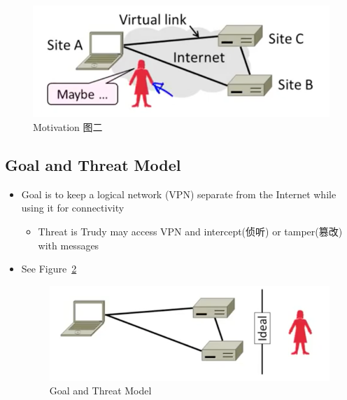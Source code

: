 \documentclass[12pt]{ctexart}   %
\begin{document}
\begin{itemize}
		\begin{figure}[h!] %
		\centering
		\includegraphics[scale=0.7]{images/10-8-2}
		\caption{Motivation 图二}
		\label{fig:10-8-2}
		\end{figure}
	\end{itemize}

	\subsection{Goal and Threat Model}
	\begin{itemize}
		\item Goal is to keep a logical network (VPN) separate from the Internet while using it for connectivity
		\begin{itemize}
			\item Threat is Trudy may access VPN and intercept(侦听) or tamper(篡改) with messages
		\end{itemize}
		\item See Figure~\ref{fig:10-8-3}
		  
		\begin{figure}[h!] %
		\centering
		\includegraphics[scale=0.7]{images/10-8-3}
		\caption{Goal and Threat Model}
		\label{fig:10-8-3}
		\end{figure}
	\end{itemize}
\end{document}
